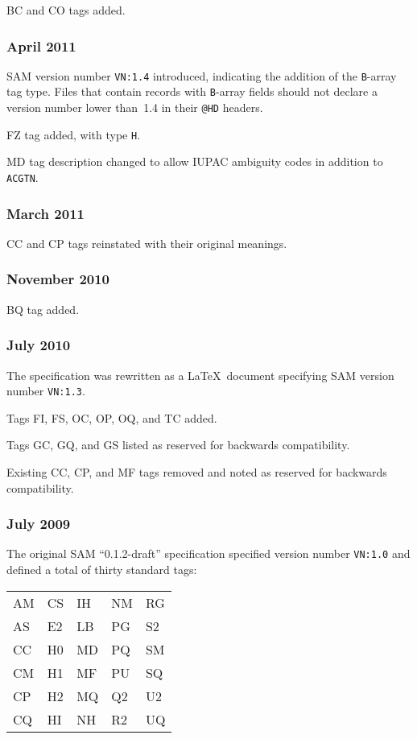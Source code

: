 \documentclass[10pt]{article}
\begin{document}
\begin{appendices}
BC and CO tags added.

\subsubsection*{April 2011}

SAM version number {\tt VN:1.4} introduced, indicating the addition of the {\tt B}-array tag type.
Files that contain records with {\tt B}-array fields should not declare a version number lower than~1.4 in their {\tt @HD} headers.

\gap
FZ tag added, with type {\tt H}.

MD tag description changed to allow IUPAC ambiguity codes in addition to {\tt ACGTN}.

\subsubsection*{March 2011}

CC and CP tags reinstated with their original meanings.

\subsubsection*{November 2010}

BQ tag added.

\subsubsection*{July 2010}

The specification was rewritten as a \LaTeX\ document specifying SAM version number {\tt VN:1.3}.

\gap
Tags FI, FS, OC, OP, OQ, and TC added.

Tags GC, GQ, and GS listed as reserved for backwards compatibility.

Existing CC, CP, and MF tags removed and noted as reserved for backwards compatibility.

\subsubsection*{July 2009}

The original SAM ``0.1.2-draft'' specification specified version number {\tt VN:1.0} and defined a total of thirty standard tags:

\begin{center}
\begin{tabular}{l@{\qquad}l@{\qquad}l@{\qquad}l@{\qquad}l}
AM & CS & IH & NM & RG \\
AS & E2 & LB & PG & S2 \\
CC & H0 & MD & PQ & SM \\
CM & H1 & MF & PU & SQ \\
CP & H2 & MQ & Q2 & U2 \\
CQ & HI & NH & R2 & UQ
\end{tabular}
\end{center}


\end{appendices}
\end{document}
